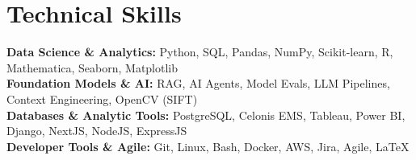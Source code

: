 \medskip

\resumeItemListStart
{}
\resumeItemListEnd
\resumeItemListEnd

\resumeSubHeadingListEnd

\section{Technical Skills}
\begin{itemize}[leftmargin=0.15in, label={}]
  \small{\item{
        \textbf{Data Science \& Analytics:} {Python, SQL, Pandas, NumPy, Scikit-learn, R, Mathematica, Seaborn, Matplotlib} \\
        \textbf{Foundation Models \& AI:} {RAG, AI Agents, Model Evals, LLM Pipelines, Context Engineering, OpenCV (SIFT)} \\
        \textbf{Databases \& Analytic Tools:} {PostgreSQL, Celonis EMS, Tableau, Power BI, Django, NextJS, NodeJS, ExpressJS} \\
        \textbf{Developer Tools \& Agile:} {Git, Linux, Bash, Docker, AWS, Jira, Agile, \LaTeX\EndAccSupp{}} \\
        }}
\end{itemize}
